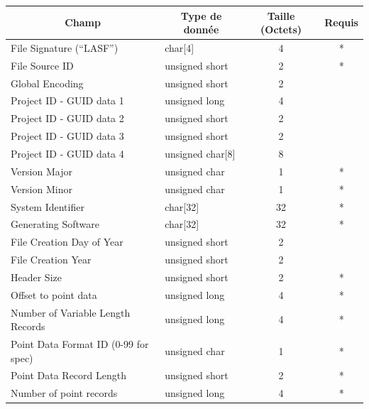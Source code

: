 \begin{table}[htpb!]
\centering
\begin{tabular}{|l|l|c|c|}
\hline
\multicolumn{1}{|c|}{\textbf{Champ}} & \multicolumn{1}{c|}{\textbf{Type de donnée}} & \textbf{Taille (Octets)} & \textbf{Requis} \\ \hline
File Signature (“LASF”)              & char{[}4{]}              & 4     & * \\ \hline
File Source ID                       & unsigned short           & 2     & * \\ \hline
Global Encoding                      & unsigned short           & 2     &   \\ \hline
Project ID - GUID data 1             & unsigned long            & 4     &   \\ \hline
Project ID - GUID data 2             & unsigned short           & 2     &   \\ \hline
Project ID - GUID data 3             & unsigned short           & 2     &   \\ \hline
Project ID - GUID data 4             & unsigned char{[}8{]}     & 8     &   \\ \hline
Version Major                        & unsigned char            & 1     & * \\ \hline
Version Minor                        & unsigned char            & 1     & * \\ \hline
System Identifier                    & char{[}32{]}             & 32    & * \\ \hline
Generating Software                  & char{[}32{]}             & 32    & * \\ \hline
File Creation Day of Year            & unsigned short           & 2     &   \\ \hline
File Creation Year                   & unsigned short           & 2     &   \\ \hline
Header Size                          & unsigned short           & 2     & * \\ \hline
Offset to point data                 & unsigned long            & 4     & * \\ \hline
Number of Variable Length Records    & unsigned long            & 4     & * \\ \hline
Point Data Format ID (0-99 for spec) & unsigned char            & 1     & * \\ \hline
Point Data Record Length             & unsigned short           & 2     & * \\ \hline
Number of point records              & unsigned long            & 4     & * \\ \hline

\end{tabular}
\end{table}
